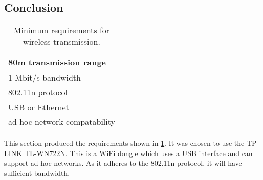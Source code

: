 \subsection{Conclusion} 
\begin{table}[H]
\centering
\caption{Minimum requirements for wireless transmission.}
\label{tab:req_wifi}
\begin{tabular}{|l|}
\hline
80m transmission range       \\ \hline
1 Mbit/s bandwidth                  \\ \hline
802.11n protocol             \\ \hline
USB or Ethernet              \\ \hline
ad-hoc network compatability \\ \hline
\end{tabular}
\end{table}
This section produced the requirements shown in \ref{tab:req_wifi}.
It was chosen to use the TP-LINK TL-WN722N.
This is a WiFi dongle which uses a USB interface and can support ad-hoc networks.
As it adheres to the 802.11n protocol, it will have sufficient bandwidth.